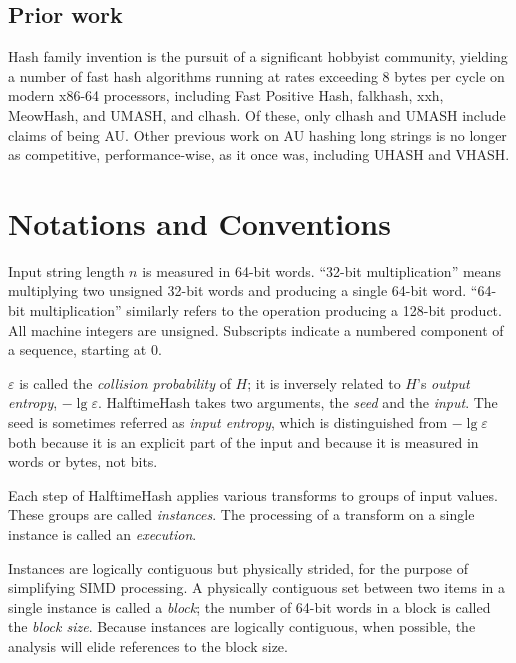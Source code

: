 \documentclass[runningheads]{llncs}
\begin{document}
\subsection{Prior work}

Hash family invention is the pursuit of a significant hobbyist community, yielding a number of fast hash algorithms running at rates exceeding 8 bytes per cycle on modern x86-64 processors, including Fast Positive Hash, falk\-hash, xxh, Meow\-Hash, and UMASH, and cl\-hash. \cite{smhasher}
Of these, only cl\-hash and U\-MASH include claims of being AU.
Other previous work on AU hashing long strings is no longer as competitive, performance-wise, as it once was, including UHASH and VHASH. \cite{clhash,umac,vmac}



\section{Notations and Conventions}

Input string length $n$ is measured in 64-bit words.
``32-bit multiplication'' means multiplying two unsigned 32-bit words and producing a single 64-bit word.
``64-bit multiplication'' similarly refers to the operation producing a 128-bit product.
All machine integers are unsigned.
Subscripts indicate a numbered component of a sequence, starting at 0.

$\varepsilon$ is called the {\em collision probability} of $H$; it is inversely related to $H$'s {\em output entropy}, $-\lg \varepsilon$.
HalftimeHash takes two arguments, the {\em seed} and the {\em input}.
The seed is sometimes referred as {\em input entropy}, which is distinguished from $-\lg \varepsilon$ both because it is an explicit part of the input and because it is measured in words or bytes, not bits.

Each step of HalftimeHash applies various transforms to groups of input values.
These groups are called {\em instances}.
The processing of a transform on a single instance is called an {\em execution}.

Instances are logically contiguous but physically strided, for the purpose of simplifying SIMD processing.
A physically contiguous set between two items in a single instance is called a {\em block}; the number of 64-bit words in a block is called the {\em block size}.
Because instances are logically contiguous, when possible, the analysis will elide references to the block size.
\end{document}
